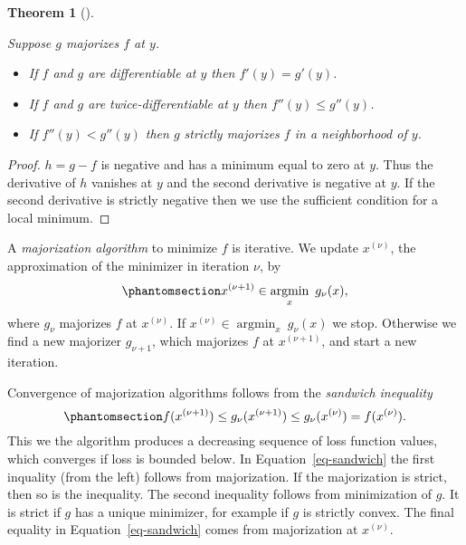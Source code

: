 \documentclass[
  12pt,
  letterpaper,
  DIV=11,
  numbers=noendperiod]{scrartcl}
\providecommand{\tightlist}{%
  \setlength{\itemsep}{0pt}\setlength{\parskip}{0pt}}\usepackage{longtable,booktabs,array}
\theoremstyle{plain}
\theoremstyle{plain}
\newtheorem{theorem}{Theorem}[section]
\theoremstyle{plain}
\theoremstyle{definition}
\theoremstyle{definition}
\theoremstyle{remark}
\begin{document}
\begin{theorem}[]\protect\hypertarget{thm-diff}{}\label{thm-diff}

Suppose \(g\) majorizes \(f\) at \(y\).

\begin{itemize}
\tightlist
\item
  If \(f\) and \(g\) are differentiable at \(y\) then \(f'(y)=g'(y)\).
\item
  If \(f\) and \(g\) are twice-differentiable at \(y\) then
  \(f''(y)\leq g''(y)\).
\item
  If \(f''(y)<g''(y)\) then \(g\) strictly majorizes \(f\) in a
  neighborhood of \(y\).
\end{itemize}

\end{theorem}

\begin{proof}
\(h=g-f\) is negative and has a minimum equal to zero at \(y\). Thus the
derivative of \(h\) vanishes at \(y\) and the second derivative is
negative at \(y\). If the second derivative is strictly negative then we
use the sufficient condition for a local minimum.
\end{proof}

A \emph{majorization algorithm} to minimize \(f\) is iterative. We
update \(x^{(\nu)}\), the approximation of the minimizer in iteration
\(\nu\), by \begin{equation}\phantomsection\label{eq-majmaj}{
x^{(\nu+1)}\in\mathop{\text{argmin}}_x\ g_\nu(x),
}\end{equation} where \(g_\nu\) majorizes \(f\) at \(x^{(\nu)}\). If
\(x^{(\nu)}\in\mathop{\text{argmin}}_x\ g_\nu(x)\) we stop. Otherwise we
find a new majorizer \(g_{\nu+1}\), which majorizes \(f\) at
\(x^{(\nu+1)}\), and start a new iteration.

Convergence of majorization algorithms follows from the \emph{sandwich
inequality} \begin{equation}\phantomsection\label{eq-sandwich}{
f(x^{(\nu+1)})\leq g_\nu(x^{(\nu+1)})\leq g_\nu(x^{(\nu)})=f(x^{(\nu)}).
}\end{equation} This we the algorithm produces a decreasing sequence of
loss function values, which converges if loss is bounded below. In
Equation~\ref{eq-sandwich} the first inquality (from the left) follows
from majorization. If the majorization is strict, then so is the
inequality. The second inequality follows from minimization of \(g\). It
is strict if \(g\) has a unique minimizer, for example if \(g\) is
strictly convex. The final equality in Equation~\ref{eq-sandwich} comes
from majorization at \(x^{(\nu)}\).
\end{document}
